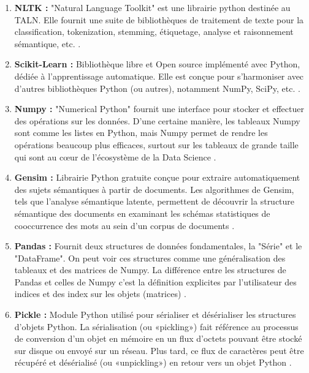             \begin{enumerate}
                \item{\textbf{NLTK : }}
                "Natural Language Toolkit" est une librairie python destinée au TALN. Elle fournit une suite de bibliothèques de traitement de texte pour la classification, tokenization, stemming, étiquetage, analyse et raisonnement sémantique, etc. \cite{nltk}.\\

                \item{\textbf{Scikit-Learn : }\label{scikit-learn}}
                Bibliothèque libre et Open source implémenté avec Python, dédiée à l'apprentissage automatique. Elle est conçue pour s'harmoniser avec d'autres bibliothèques Python (ou autres), notamment NumPy, SciPy, etc. \cite{scikit}.\\

                \item{\textbf{Numpy : }}
                "Numerical Python" fournit une interface pour stocker et effectuer des opérations sur les données. D'une certaine manière, les tableaux Numpy sont comme les listes en Python, mais Numpy permet de rendre les opérations beaucoup plus efficaces, surtout sur les tableaux de grande taille qui sont au cœur de l'écosystème de la Data Science \cite{numpy}.\\
                
                \item{\textbf{Gensim : }}
                Librairie Python gratuite conçue pour extraire automatiquement des sujets sémantiques à partir de documents. Les algorithmes de Gensim, tels que l'analyse sémantique latente, permettent de découvrir la structure sémantique des documents en examinant les schémas statistiques de cooccurrence des mots au sein d'un corpus de documents \cite{gensim}.\\

                \item{\textbf{Pandas : }}
                Fournit deux structures de données fondamentales, la "Série" et le "DataFrame". On peut voir ces structures comme une généralisation des tableaux et des matrices de Numpy. La différence entre les structures de Pandas et celles de Numpy c'est la définition explicites par l'utilisateur des indices et des index sur les objets (matrices) .\cite{pandas}\\

                \item{\textbf{Pickle : }}
                Module Python utilisé pour sérialiser et désérialiser les structures d'objets Python. La sérialisation (ou «pickling») fait référence au processus de conversion d'un objet en mémoire en un flux d'octets pouvant être stocké sur disque ou envoyé sur un réseau. Plus tard, ce flux de caractères peut être récupéré et désérialisé (ou «unpickling») en retour vers un objet Python \cite{pickle}.\\


\end{enumerate}
